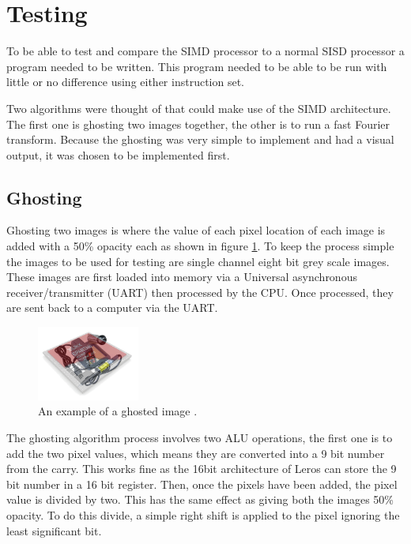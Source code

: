 \section{Testing}

To be able to test and compare the SIMD processor to a normal SISD processor a program
needed to be written. This program needed to be able to be run with little or no
difference using either instruction set.

Two algorithms were thought of that could make use of the SIMD architecture.
The first one is ghosting two images together, the other is to run a fast
Fourier transform. Because the ghosting was very simple to implement and had a
visual output, it was chosen to be implemented first.

\subsection{Ghosting}
  Ghosting two images is where the value of each pixel location of each image is
  added with a 50\% opacity each as shown in figure \ref{ghosting}. To keep the
  process simple the images to be used for testing are single channel eight bit
  grey scale images. These images are first loaded into memory via a Universal
  asynchronous receiver/transmitter (UART) then processed by the CPU.
  Once processed, they are sent back to a computer  via the UART.

  \begin{figure}[ht]
  \centering
  \includegraphics[width=0.3\textwidth]{images/ghosted}
  \caption{An example of a ghosted image \cite{spartan_user}.}
  \label{ghosting}
  \end{figure}

  The ghosting algorithm process involves two ALU operations, the first one is
  to add the two pixel values, which means they are converted into a 9 bit
  number from the carry. This works fine as the 16bit architecture of Leros can
  store the 9 bit number in a 16 bit register. Then, once the pixels have been
  added, the pixel value is divided by two. This has the same effect as giving
  both the images 50\% opacity. To do this divide, a simple right shift is
  applied to the pixel ignoring the least significant bit.

